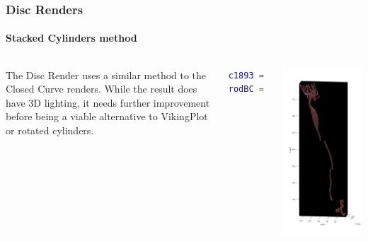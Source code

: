 \documentclass[11pt]{beamer}
\begin{document}
\begin{frame}[fragile]
	\frametitle{Disc Renders}
	\framesubtitle{Stacked Cylinders method}
	\begin{columns}
			The Disc Render uses a similar method to the Closed Curve renders. While the result does have 3D lighting, it needs further improvement before being a viable alternative to VikingPlot or rotated cylinders.
\begin{lstlisting}[language=matlab]
c1893 = sbfsem.Neuron(1893, `i');
rodBC = sbfsem.render.Disc(1893);\end{lstlisting}
			\includegraphics[width=\textwidth]{rbc}
	\end{columns}
\end{frame}
\end{document}
